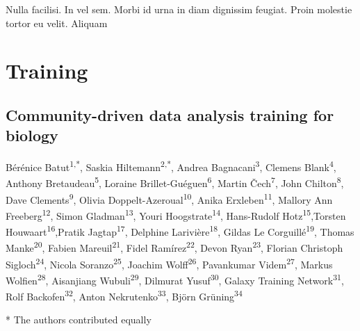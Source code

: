 \begin{savequote}[75mm]
Nulla facilisi. In vel sem. Morbi id urna in diam dignissim feugiat. Proin molestie tortor eu velit. Aliquam
\end{savequote}

\chapter{Training}
\label{training}
\setcounter{figure}{-1}
\setcounter{table}{-1}
\setcounter{section}{-1}

\newpage
\section*{Community-driven data analysis training for biology}
Bérénice Batut\textsuperscript{1,*}, Saskia Hiltemann\textsuperscript{2,*}, Andrea Bagnacani\textsuperscript{3}, Clemens Blank\textsuperscript{4}, Anthony Bretaudeau\textsuperscript{5}, Loraine Brillet-Guéguen\textsuperscript{6}, Martin Čech\textsuperscript{7}, John Chilton\textsuperscript{8}, Dave Clements\textsuperscript{9}, Olivia Doppelt-Azeroual\textsuperscript{10}, Anika Erxleben\textsuperscript{11}, Mallory Ann Freeberg\textsuperscript{12}, Simon Gladman\textsuperscript{13}, Youri Hoogstrate\textsuperscript{14}, Hans-Rudolf Hotz\textsuperscript{15},Torsten Houwaart\textsuperscript{16},Pratik Jagtap\textsuperscript{17}, Delphine Larivière\textsuperscript{18}, Gildas Le Corguillé\textsuperscript{19}, Thomas Manke\textsuperscript{20}, Fabien Mareuil\textsuperscript{21}, Fidel Ramírez\textsuperscript{22}, Devon Ryan\textsuperscript{23}, Florian Christoph Sigloch\textsuperscript{24}, Nicola Soranzo\textsuperscript{25}, Joachim Wolff\textsuperscript{26}, Pavankumar Videm\textsuperscript{27}, Markus Wolfien\textsuperscript{28}, Aisanjiang Wubuli\textsuperscript{29}, Dilmurat Yusuf\textsuperscript{30}, Galaxy Training Network\textsuperscript{31}, Rolf Backofen\textsuperscript{32}, Anton Nekrutenko\textsuperscript{33}, Björn Grüning\textsuperscript{34}

* The authors contributed equally

